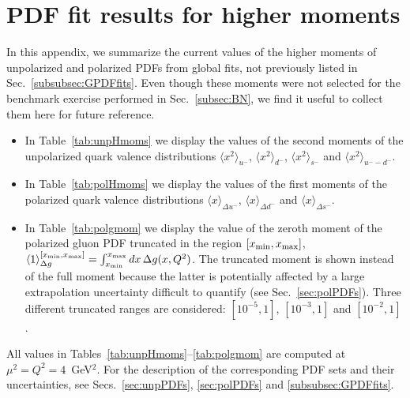 \section{PDF fit results for higher moments }
\label{app:Hmoms}

In this appendix, we summarize the current values of the higher moments of 
unpolarized and polarized PDFs from global fits, not previously 
listed in Sec.~\ref{subsubsec:GPDFfits}.
%
Even though these moments were not selected for the benchmark exercise 
performed in Sec.~\ref{subsec:BN}, we find it useful to collect them 
here for future reference.

\begin{itemize}

\item In Table~\ref{tab:unpHmoms} we display the values of the second moments 
of the unpolarized quark valence distributions $\langle x^2\rangle_{u^-}$, 
$\langle x^2\rangle_{d^-}$, $\langle x^2\rangle_{s^-}$ and 
$\langle x^2\rangle_{u^--d^-}$.

\item In Table~\ref{tab:polHmoms} we display the values of the first moments 
of the polarized quark valence distributions $\langle x\rangle_{\Delta u^-}$, 
$\langle x\rangle_{\Delta d^-}$ and $\langle x\rangle_{\Delta s^-}$.

\item In Table~\ref{tab:polgmom} we display the value of the zeroth moment
of the polarized gluon PDF truncated in the region $[x_{\rm min}, x_{\rm max}]$,
$\langle 1\rangle_{\Delta g}^{[x_{\rm min}, x_{\rm max}]}=\int_{x_{\rm min}}^{x_{\rm max}}dx\,\Delta g(x,Q^2)$.
%
The truncated moment is shown instead of the full moment
because the latter is potentially affected by a large extrapolation 
uncertainty difficult to quantify (see Sec.~\ref{sec:polPDFs}). 
%
Three different truncated ranges are considered: $[10^{-5},1]$,  $[10^{-3},1]$
and  $[10^{-2},1]$.

\end{itemize}
%
All values in Tables~\ref{tab:unpHmoms}--\ref{tab:polgmom} are computed at 
$\mu^2=Q^2=4$~GeV$^2$.
%
For the description of the corresponding PDF sets and their uncertainties, see
Secs.~\ref{sec:unpPDFs}, \ref{sec:polPDFs} and \ref{subsubsec:GPDFfits}.


